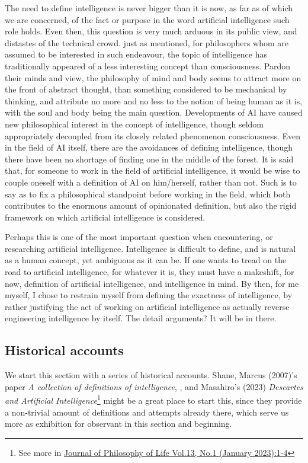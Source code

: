 The need to define intelligence is never bigger than it is now, as far as of which we are concerned, of the fact or purpose in the word artificial intelligence such role holds. Even then, this question is very much arduous in its public view, and distastes of the technical crowd. just as \cite{Oygarden2019} mentioned, for philosophers whom are assumed to be interested in such endeavour, the topic of intelligence has traditionally appeared of a less interesting concept than consciousness. Pardon their minds and view, the philosophy of mind and body seems to attract more on the front of abstract thought, than something considered to be mechanical by thinking, and attribute no more and no less to the notion of being human as it is, with the soul and body being the main question. Developments of AI have caused new philosophical interest in the concept of intelligence, though seldom appropriately decoupled from its closely related phenomenon consciousness. Even in the field of AI itself, there are the avoidances of defining intelligence, though there have been no shortage of finding one in the middle of the forest. It is said that, for someone to work in the field of artificial intelligence, it would be wise to couple oneself with a definition of AI on him/herself, rather than not. Such is to say as to fix a philosophical standpoint before working in the field, which both contributes to the enormous amount of opinionated definition, but also the rigid framework on which artificial intelligence is considered. 

Perhaps this is one of the most important question when encountering, or researching artificial intelligence. Intelligence is difficult to define, and is natural as a human concept, yet ambiguous as it can be. If one wants to tread on the road to artificial intelligence, for whatever it is, they must have a makeshift, for now, definition of artificial intelligence, and intelligence in mind. By then, for me myself, I chose to restrain myself from defining the exactness of intelligence, by rather justifying the act of working on artificial intelligence as actually reverse engineering intelligence by itself. The detail arguments? It will be in there. 

\subsection{Historical accounts}

We start this section with a series of historical accounts. Shane, Marcus (2007)'s paper \textit{A collection of definitions of intelligence}, \cite{legg2007collectiondefinitionsintelligence}, and Masahiro's (2023) \textit{Descartes and Artificial Intelligence}\footnote{See more in \href{https://www.philosophyoflife.org/jpl2023si_book.pdf}{Journal of Philosophy of Life Vol.13, No.1 (January 2023):1-4}} might be a great place to start this, since they provide a non-trivial amount of definitions and attempts already there, which serve us more as exhibition for observant in this section and beginning. 

